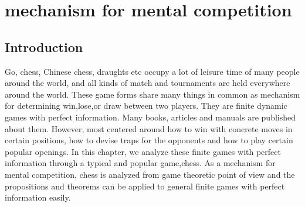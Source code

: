 
\chapter{ mechanism for mental competition }  %

\label{Chapter5} %



\section{Introduction}
 Go, chess, Chinese chess, draughts etc occupy a lot of leisure time of many people around the world, and all kinds of match and tournaments are held everywhere around the world. 
 These game forms share many things in common as mechanism for determining win,lose,or draw between two players. They are finite dynamic games with perfect information.
 Many books, articles and manuals are published about them. However, most centered around how to win with concrete moves in certain positions, how to devise traps for the opponents and how to 
 play certain popular openings.  In this chapter, we analyze these finite games with perfect information through a typical and popular game,chess. 
 As a mechanism for mental competition, chess is analyzed from game theoretic point of view and the propositions and theorems can be applied to general finite games with perfect information easily.

